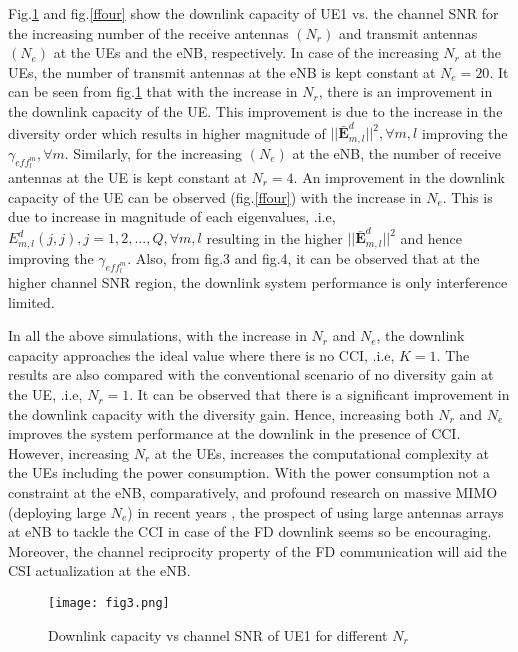 \documentclass[conference]{IEEEtran}
\begin{document}
Fig.\ref{fthree} and fig.\ref{ffour} show the downlink capacity of UE1 vs. the channel SNR for the increasing number of the receive antennas $(N_r)$ and transmit antennas $(N_e)$ at the UEs and the eNB, respectively. In case of the increasing $N_r$ at the UEs, the number of transmit antennas at the eNB is kept constant at $N_e = 20$. It can be seen from fig.\ref{fthree} that with the increase in $N_r$, there is an improvement in the downlink capacity of the UE. This improvement is due to the increase in the diversity order which results in higher magnitude of $||\mathbf{\bar{E}}^d_{m,l}||^2, \forall m, l$ improving the  $\gamma_{eff^m_l}, \forall m$. Similarly, for the increasing $(N_e)$ at the eNB, the number of receive antennas at the UE is kept constant at $N_r = 4$. An improvement in the downlink capacity of the UE can be observed (fig.\ref{ffour}) with the increase in $N_e$. This is due to increase in magnitude of each eigenvalues, .i.e, $E^d_{m,l}(j,j), j=1,2,...,Q, \forall m, l$ resulting in the higher $||\mathbf{\bar{E}}^d_{m,l}||^2$ and hence improving the $\gamma_{eff^m_l}$. Also, from fig.3 and fig.4, it can be observed that at the higher channel SNR region, the downlink system performance is only interference limited. \par 

In all the above simulations, with the increase in $N_r$ and $N_e$, the downlink capacity approaches the ideal value where there is no CCI, .i.e, $K = 1$. The results are also compared with the conventional scenario of no diversity gain at the UE, .i.e, $N_r =1$. It can be observed that there is a significant improvement in the downlink capacity with the diversity gain. Hence, increasing both $N_r$ and $N_e$ improves the system performance at the downlink in the presence of CCI. However, increasing $N_r$ at the UEs, increases the computational complexity at the UEs including the power consumption. With the power consumption not a constraint at the eNB, comparatively, and profound research on massive MIMO (deploying large $N_e$) in recent years \cite{massive}, the prospect of using large antennas arrays at eNB to tackle the CCI in case of the FD downlink seems so be encouraging. Moreover, the channel reciprocity property of the FD communication will aid the CSI actualization at the eNB.   \par 

\begin{figure}
\centering
\texttt{[image: fig3.png]}
\vspace{-0.5em}
   \caption{Downlink capacity vs channel SNR of UE1 for different $N_r$}
   \label{fthree}
   \vspace{-1.0em}
\end{figure}
\end{document}
